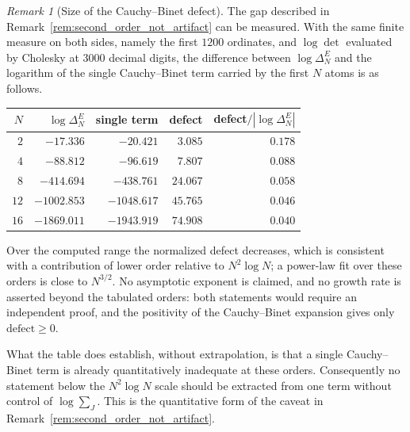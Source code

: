 \documentclass[preprint,12pt]{elsarticle}
\numberwithin{equation}{section}
\theoremstyle{plain}
\theoremstyle{definition}
\theoremstyle{remark}
\newtheorem{remark}[theorem]{Remark}
\begin{document}
\begin{remark}[Size of the Cauchy--Binet defect]
\label{rem:cauchy_binet_defect_numerics}
The gap described in Remark~\ref{rem:second_order_not_artifact} can be measured. With the same finite measure on both sides, namely the first $1200$ ordinates, and $\log\det$ evaluated by Cholesky at $3000$ decimal digits, the difference between $\log\Delta_N^E$ and the logarithm of the single Cauchy--Binet term carried by the first $N$ atoms is as follows.
\begin{center}
\small
\begin{tabular}{rrrrr}
\toprule
$N$ & $\log\Delta_N^E$ & single term & defect & defect$/|\log\Delta_N^E|$\\
\midrule
$2$ & $-17.336$ & $-20.421$ & $3.085$ & $0.178$\\
$4$ & $-88.812$ & $-96.619$ & $7.807$ & $0.088$\\
$8$ & $-414.694$ & $-438.761$ & $24.067$ & $0.058$\\
$12$ & $-1002.853$ & $-1048.617$ & $45.765$ & $0.046$\\
$16$ & $-1869.011$ & $-1943.919$ & $74.908$ & $0.040$\\
\bottomrule
\end{tabular}
\end{center}
Over the computed range the normalized defect decreases, which is consistent with a contribution of lower order relative to $N^2\log N$; a power-law fit over these orders is close to $N^{3/2}$. No asymptotic exponent is claimed, and no growth rate is asserted beyond the tabulated orders: both statements would require an independent proof, and the positivity of the Cauchy--Binet expansion gives only $\text{defect}\ge0$.

What the table does establish, without extrapolation, is that a single Cauchy--Binet term is already quantitatively inadequate at these orders. Consequently no statement below the $N^2\log N$ scale should be extracted from one term without control of $\log\sum_J$. This is the quantitative form of the caveat in Remark~\ref{rem:second_order_not_artifact}.
\end{remark}
\end{document}
